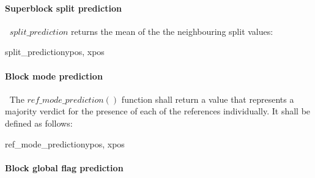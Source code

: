 \paragraph{Superblock split prediction}
\label{splitprediction}
$\ $\newline
$split\_prediction$ returns the mean of the the neighbouring split values:

\begin{pseudo}{split\_prediction}{ypos, xpos}
    \bsRET{\SBSplit[ypos][xpos-1]}
    \bsRET{\SBSplit[ypos-1][xpos]}
\bsEND

\end{pseudo}

\paragraph{Block mode prediction}
\label{modeprediction}
$\ $\newline
The $ref\_mode\_prediction()$ function shall return a value that represents a majority
 verdict for the presence of each of the references individually. It shall be defined
 as follows:

\begin{pseudo}{ref\_mode\_prediction}{ypos, xpos}
    \bsRET{\Intra}
    \bsRET{\BlockData[0][xpos-1][\RMode]}
    \bsRET{\BlockData[ypos-1][0][\RMode]}
\bsELSE
\bsEND
\end{pseudo}

\paragraph{Block global flag prediction}
\label{blockglobalprediction}
$\ $\newline

